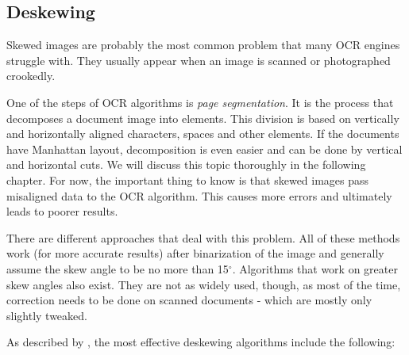 \subsection{Deskewing}

Skewed images are probably the most common problem that many OCR engines struggle with. They usually appear when an image is scanned or photographed crookedly. 

One of the steps of OCR algorithms is \emph{page segmentation}. It is the process that decomposes a document image into elements. This division is based on vertically and horizontally aligned characters, spaces and other elements. If the documents have Manhattan layout, decomposition is even easier and can be done by vertical and horizontal cuts. We will discuss this topic thoroughly in the following chapter. For now, the important thing to know is that skewed images pass misaligned data to the OCR algorithm. This causes more errors and ultimately leads to poorer results.

There are different approaches that deal with this problem. All of these methods work (for more accurate results) after binarization of the image and generally assume the skew angle to be no more than 15$^{\circ}$. Algorithms that work on greater skew angles also exist\citep{skewAngleDetection}. They are not as widely used, though, as most of the time, correction needs to be done on scanned documents - which are mostly only slightly tweaked.

As described by \citet{skewBestTechniques}, the most effective deskewing algorithms include the following:

